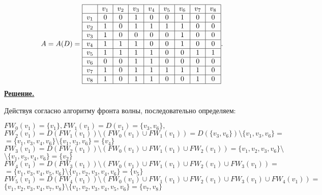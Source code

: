 \documentclass[12pt, letterpaper, titlepage]{article}
\begin{document}
\begin{equation*}
    A = A(D) =
    \begin{tabular}{ | c | c | c | c | c | c | c | c | c |}
        \hline
              & $v_1$ & $v_2$ & $v_3$ & $v_4$ & $v_5$ & $v_6$ & $v_7$ & $v_8$ \\
        \hline
        $v_1$ & 0     & 0     & 1     & 0     & 0     & 1     & 0     & 0     \\
        \hline
        $v_2$ & 1     & 0     & 1     & 1     & 1     & 1     & 0     & 0     \\
        \hline
        $v_3$ & 1     & 0     & 0     & 0     & 0     & 1     & 0     & 0     \\
        \hline
        $v_4$ & 1     & 1     & 1     & 0     & 0     & 1     & 0     & 0     \\
        \hline
        $v_5$ & 1     & 1     & 1     & 1     & 0     & 0     & 1     & 1     \\
        \hline
        $v_6$ & 0     & 0     & 1     & 1     & 0     & 0     & 0     & 0     \\
        \hline
        $v_7$ & 1     & 0     & 1     & 1     & 1     & 1     & 1     & 0     \\
        \hline
        $v_8$ & 1     & 0     & 1     & 1     & 0     & 0     & 1     & 0     \\
        \hline
    \end{tabular}.
\end{equation*}
\underline{\textbf{Решение.}}

Действуя согласно алгоритму фронта волны, последовательно определяем:

$FW_0(v_1)=\{v_1\}, FW_1(v_1)=D(v_1)=\{v_3,v_6\},$\\
$FW_2(v_1)=D(FW_1(v_1)) \setminus (FW_0(v_1) \cup FW_1(v_1))=D(\{v_3,v_6\}) \setminus \{v_1,v_3,v_6\}=$\\
$=\{v_1,v_3,v_4,v_6\} \setminus \{v_1,v_3,v_6\}=\{v_4\}$\\
$FW_3(v_1)=D(FW_2(v_1)) \setminus (FW_0(v_1)\cup FW_1(v_1)\cup FW_2(v_1))=\{v_1,v_2,v_3,v_6\} \setminus$\\
$\setminus \{v_1,v_3,v_4,v_6\}=\{v_2\}$\\
$FW_4(v_1)=D(FW_3(v_1)) \setminus (FW_0(v_1)\cup FW_1(v_1)\cup FW_2(v_1)\cup FW_3(v_1))=$\\
$=\{v_1,v_3,v_4,v_5,v_6\} \setminus \{v_1,v_2,v_3,v_4,v_6\}=\{v_5\}$\\
$FW_5(v_1)=D(FW_4(v_1)) \setminus (FW_0(v_1)\cup FW_1(v_1)\cup FW_2(v_1)\cup FW_3(v_1)\cup FW_4(v_1))=$\\
$\{v_1,v_2,v_3,v_4,v_7,v_8\}\setminus \{v_1,v_2,v_3,v_4,v_5,v_6\}=\{v_7,v_8\}$
\end{document}
